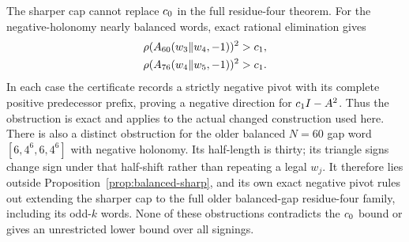The sharper cap cannot replace $c_0$ in the full residue-four theorem.
For the negative-holonomy nearly balanced words, exact rational elimination
gives
\begin{align*}
 \rho(A_{60}(w_3\|w_4,-1))^2&>c_1,\\
 \rho(A_{76}(w_4\|w_5,-1))^2&>c_1.
\end{align*}
In each case the certificate records a strictly negative pivot with its
complete positive predecessor prefix, proving a negative direction for
$c_1 I-A^2$. Thus the obstruction is exact and applies to the actual
changed construction used here.
There is also a distinct obstruction for the older balanced $N=60$ gap
word $[6,4^6,6,4^6]$ with negative holonomy. Its half-length is thirty;
its triangle signs change sign under that half-shift rather than repeating
a legal $w_j$. It therefore lies outside
Proposition~\ref{prop:balanced-sharp}, and its own exact negative pivot
rules out extending the sharper cap to the full older balanced-gap
residue-four family, including its odd-$k$ words.
None of these obstructions contradicts the $c_0$ bound or gives an
unrestricted lower bound over all signings.
